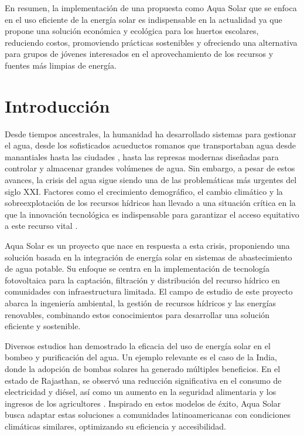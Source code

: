 \documentclass[12pt]{article}
\begin{document}
En resumen, la implementación de una propuesta como Aqua Solar que se enfoca en el uso eficiente de la energía solar es indispensable en la actualidad ya que propone una solución económica y ecológica para los huertos escolares, reduciendo costos, promoviendo prácticas sostenibles y ofreciendo una alternativa para grupos de jóvenes interesados en el aprovechamiento de los recursos y fuentes más limpias de energía.


\newpage
\section{Introducción}
Desde tiempos ancestrales, la humanidad ha desarrollado sistemas para gestionar el agua, desde los sofisticados acueductos romanos que transportaban agua desde manantiales hasta las ciudades \cite{AcueductoRomano}, hasta las represas modernas diseñadas para controlar y almacenar grandes volúmenes de agua. Sin embargo, a pesar de estos avances, la crisis del agua sigue siendo una de las problemáticas más urgentes del siglo XXI. Factores como el crecimiento demográfico, el cambio climático y la sobreexplotación de los recursos hídricos han llevado a una situación crítica en la que la innovación tecnológica es indispensable para garantizar el acceso equitativo a este recurso vital \cite{ONUAgua2023, UNESCO2024}.


Aqua Solar es un proyecto que nace en respuesta a esta crisis, proponiendo una solución basada en la integración de energía solar en sistemas de abastecimiento de agua potable. Su enfoque se centra en la implementación de tecnología fotovoltaica para la captación, filtración y distribución del recurso hídrico en comunidades con infraestructura limitada. El campo de estudio de este proyecto abarca la ingeniería ambiental, la gestión de recursos hídricos y las energías renovables, combinando estos conocimientos para desarrollar una solución eficiente y sostenible.

Diversos estudios han demostrado la eficacia del uso de energía solar en el bombeo y purificación del agua. Un ejemplo relevante es el caso de la India, donde la adopción de bombas solares ha generado múltiples beneficios. En el estado de Rajasthan, se observó una reducción significativa en el consumo de electricidad y diésel, así como un aumento en la seguridad alimentaria y los ingresos de los agricultores \cite{Kishore2019}. Inspirado en estos modelos de éxito, Aqua Solar busca adaptar estas soluciones a comunidades latinoamericanas con condiciones climáticas similares, optimizando su eficiencia y accesibilidad.
\end{document}

